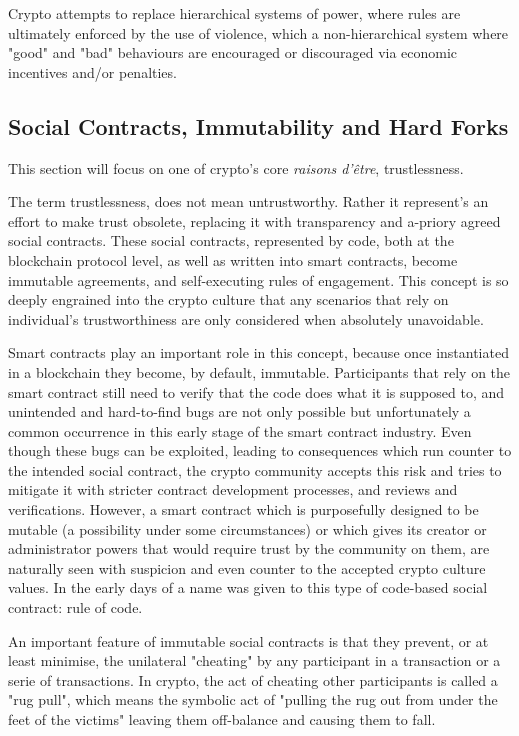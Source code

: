 Crypto attempts to replace hierarchical systems of power, where rules are ultimately enforced by the use of violence, which a non-hierarchical system where "good" and "bad" behaviours are encouraged or discouraged via economic incentives and/or penalties.

\subsection{Social Contracts, Immutability and Hard Forks}

This section will focus on one of crypto's core \emph{raisons d'être}, trustlessness.

The term trustlessness, does not mean untrustworthy. Rather it represent's an effort to make trust obsolete, replacing it with transparency and a-priory agreed social contracts. These social contracts, represented by code, both at the blockchain protocol level, as well as written into smart contracts, become immutable agreements, and self-executing rules of engagement. This concept is so deeply engrained into the crypto culture that any scenarios that rely on individual's trustworthiness are only considered when absolutely unavoidable.

Smart contracts play an important role in this concept, because once instantiated in a blockchain they become, by default, immutable. Participants that rely on the smart contract still need to verify that the code does what it is supposed to, and unintended and hard-to-find bugs are not only possible but unfortunately a common occurrence in this early stage of the smart contract industry. Even though these bugs can be exploited, leading to consequences which run counter to the intended social contract, the crypto community accepts this risk and tries to mitigate it with stricter contract development processes, and reviews and verifications. However, a smart contract which is purposefully designed to be mutable (a possibility under some circumstances) or which gives its creator or administrator powers that would require trust by the community on them, are naturally seen with suspicion and even counter to the accepted crypto culture values. In the early days of  a name was given to this type of code-based social contract: rule of code.

An important feature of immutable social contracts is that they prevent, or at least minimise, the unilateral "cheating" by any participant in a transaction or a serie of transactions. In crypto, the act of cheating other participants is called a "rug pull", which means the symbolic act of "pulling the rug out from under the feet of the victims" leaving them off-balance and causing them to fall.

